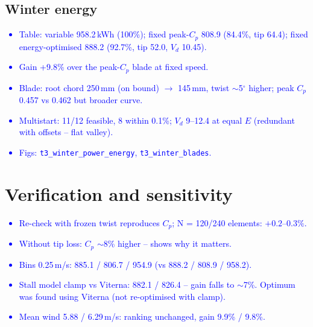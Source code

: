 \documentclass[11pt,a4paper]{article}
\newcommand{\note}[1]{\textcolor{blue}{#1}}
\begin{document}
\subsection{Winter energy}
\note{
\begin{itemize}
  \item Table: variable 958.2\,kWh (100\%); fixed peak-$C_p$ 808.9 (84.4\%, tip 64.4); fixed energy-optimised 888.2 (92.7\%, tip 52.0, $V_d$ 10.45).
  \item Gain +9.8\% over the peak-$C_p$ blade at fixed speed.
  \item Blade: root chord 250\,mm (on bound) $\to$ 145\,mm, twist $\sim$5$^\circ$ higher; peak $C_p$ 0.457 vs 0.462 but broader curve.
  \item Multistart: 11/12 feasible, 8 within 0.1\%; $V_d$ 9--12.4 at equal $E$ (redundant with offsets -- flat valley).
  \item Figs: \texttt{t3\_winter\_power\_energy}, \texttt{t3\_winter\_blades}.
\end{itemize}
}

\section{Verification and sensitivity}  %
\note{
\begin{itemize}
  \item Re-check with frozen twist reproduces $C_p$; N = 120/240 elements: $+0.2$--$0.3\%$.
  \item Without tip loss: $C_p$ $\sim$8\% higher -- shows why it matters.
  \item Bins 0.25\,m/s: 885.1 / 806.7 / 954.9 (vs 888.2 / 808.9 / 958.2).
  \item Stall model clamp vs Viterna: 882.1 / 826.4 -- gain falls to $\sim$7\%. Optimum was found using Viterna (not re-optimised with clamp).
  \item Mean wind 5.88 / 6.29\,m/s: ranking unchanged, gain 9.9\% / 9.8\%.
\end{itemize}
}

\end{document}
